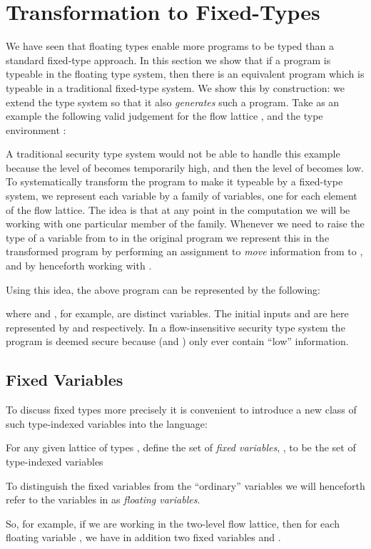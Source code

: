 \documentclass{sigplanconf}
\begin{document}
\begin{table}
\section{Transformation to Fixed-Types}
\label{sect:transformation}
We have seen that floating types enable more programs to be typed than
a standard fixed-type approach.  In this section we show that if
a program is typeable in the floating type system, then there is an
equivalent program which is typeable in a traditional fixed-type system. We
show this by construction: we extend the type system so that it also
\emph{generates} such a program. 
Take as an example the following valid judgement for the flow lattice , and the type environment 
:

A traditional security type system would not be able to handle this
example because the level of  becomes temporarily high, and then
the level of  becomes low.  To systematically transform the program to
make it typeable by a fixed-type system, we represent
each variable by a family of variables, one for each element of the
flow lattice. The idea is that at any point in the computation we will
be working with one particular member of the family.  Whenever we need
to raise the type of a variable from  to  in the original program
we represent
this in the transformed program by performing an assignment to \emph{move} 
information from  to , and by
henceforth working with .

Using this idea, the above program can be represented by the following:

where  and , for example, are distinct variables. 
The initial inputs  and  are here represented by  and  respectively. 
In a flow-insensitive security type system the program is deemed secure because
 (and ) only ever contain ``low'' information. 


\subsection{Fixed Variables}
To discuss fixed types more precisely it is convenient to 
introduce a new class of such type-indexed 
variables into the language: 
\begin{definition}
  For any given lattice of types , define the set of
  \emph{fixed variables}, ,  to be the set of type-indexed variables 

  To distinguish the
  fixed variables from the ``ordinary'' variables we will henceforth
  refer to the variables in  as \emph{floating variables}.
\end{definition}
So, for example, if we are working in the two-level flow lattice,
then for each floating variable , we have in addition two fixed
variables  and .


\end{table}
\end{document}

